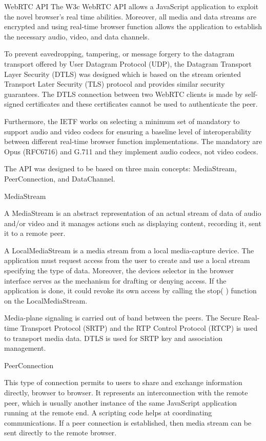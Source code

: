 WebRTC API 
The W3c WebRTC API allows a JavaScript application to exploit the novel browser’s real time abilities. Moreover, all media and data streams are encrypted and using real-time browser function  allows the application to establish the necessary audio, video, and data channels. 

To prevent eavedropping, tampering, or message forgery to the datagram transport offered by User Datagram Protocol (UDP), the Datagram Transport Layer Security (DTLS) was designed which is based on the stream oriented Transport Later Security (TLS) protocol and provides similar security guarantees. The DTLS connection between two WebRTC clients is made by self-signed certificates and these certificates cannot be used to authenticate the peer. 

Furthermore, the IETF works on selecting a minimum set of mandatory to support audio and video codecs for ensuring a baseline level of interoperability between different real-time browser function implementations. The mandatory are Opus (RFC6716) and G.711 and they implement audio codecs, not video codecs. 

The API was designed to be based on three main concepts: MediaStream, PeerConnection, and DataChannel. 

MediaStream 

A MediaStream is an abstract representation of an actual stream of data of audio and/or video and it manages actions such as displaying content, recording it, sent it to a remote peer. 

A LocalMediaStream is a media stream from a local media-capture device. The application must request access from the user to create and use a local stream specifying the type of data. Moreover, the devices selector in the browser interface serves as the mechanism for drafting or denying access. If the application is done, it could revoke its own access by calling the stop( ) function on the LocalMediaStream. 

Media-plane signaling is carried out of band between the peers. The Secure Real-time Transport Protocol (SRTP) and the RTP Control Protocol (RTCP) is used to transport media data. DTLS is used for SRTP key and association management. 


PeerConnection 

This type of connection permits to users to share and exchange information directly, browser to browser. It represents an interconnection with the remote peer, which is usually another instance of the same JavaScript application running at the remote end. A scripting code helps at coordinating communications. If a peer connection is established, then media stream can be sent directly to the remote browser. 

